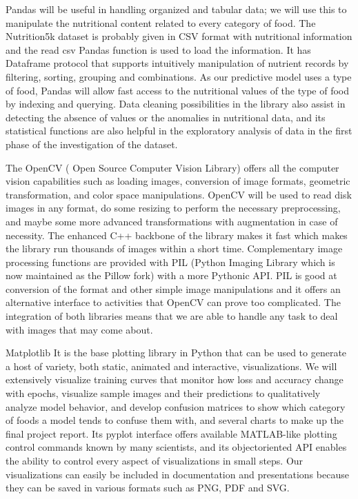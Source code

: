 \documentclass[12pt, openany]{report}
\begin{document}
Pandas will be useful in handling organized and tabular data; we will use this to manipulate the nutritional content related to every category of food. The Nutrition5k dataset is probably given in CSV format with nutritional information and the read csv Pandas function is used to load the information. It has Dataframe protocol that supports intuitively manipulation of nutrient records by filtering, sorting, grouping and combinations. As our predictive model uses a type of food, Pandas will allow fast access to the nutritional values of the type of food by indexing and querying. Data cleaning possibilities in the library also assist in detecting the absence of values or the anomalies in nutritional data, and its statistical functions are also helpful in the exploratory analysis of data in the first phase of the investigation of the dataset.

The OpenCV ( Open Source Computer Vision Library) offers all the computer vision capabilities such as loading images, conversion of image formats, geometric transformation, and color space manipulations. OpenCV will be used to read disk images in any format, do some resizing to perform the necessary preprocessing, and maybe some more advanced transformations with augmentation in case of necessity. The enhanced C++ backbone of the library makes it fast which makes the library run thousands of images within a short time. Complementary image processing functions are provided with PIL (Python Imaging Library which is now maintained as the Pillow fork) with a more Pythonic API. PIL is good at conversion of the format and other simple image manipulations and it offers an alternative interface to activities that OpenCV can prove too complicated. The integration of both libraries means that we are able to handle any task to deal with images that may come about.

Matplotlib It is the base plotting library in Python that can be used to generate a host of variety, both static, animated and interactive, visualizations. We will extensively visualize training curves that monitor how loss and accuracy change with epochs, visualize sample images and their predictions to qualitatively analyze model behavior, and develop confusion matrices to show which category of foods a model tends to confuse them with, and several charts to make up the final project report. Its pyplot interface offers available MATLAB-like plotting control commands known by many scientists, and its objectoriented API enables the ability to control every aspect of visualizations in small steps. Our visualizations can easily be included in documentation and presentations because they can be saved in various formats such as PNG, PDF and SVG.
\end{document}

